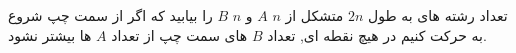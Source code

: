 \begin{PROBLEM}
    تعداد رشته های به طول 
    $2n$
    متشکل از
    $n$ 
  $A$
    و
    $n$
  $B$
    را بیابید که اگر از سمت چپ شروع به حرکت کنیم در هیچ نقطه ای, تعداد 
  $B$
    های سمت چپ از تعداد 
  $A$
    ها بیشتر نشود.
  \end{PROBLEM}
